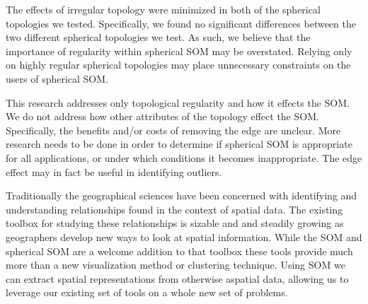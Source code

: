 The effects of irregular topology were minimized in both of the spherical
topologies we tested.  Specifically, we found no significant differences
between the two different spherical topologies we test.  As such, we believe
that the importance of regularity within spherical SOM may be overstated.
Relying only on highly regular spherical topologies may place
unnecessary constraints on the users of spherical SOM.  

This research addresses only topological regularity and how it effects the SOM.
We do not address how other attributes of the topology effect the SOM.
Specifically, the benefits and/or costs of removing the edge are unclear.  More
research needs to be done in order to determine if spherical SOM is appropriate
for all applications, or under which conditions it becomes inappropriate.  The
edge effect may in fact be useful in identifying outliers.


Traditionally the geographical sciences have been concerned with identifying and
understanding relationships found in the context of spatial data.  
The existing toolbox for studying these relationships is sizable and
and steadily growing as geographers develop new ways to look at spatial
information.  While the SOM and spherical SOM are a welcome addition to that
toolbox these tools provide much more than a new visualization method or
clustering technique.  Using SOM we can extract spatial representations from
otherwise aspatial data, allowing us to leverage our existing set of
tools on a whole new set of problems.



